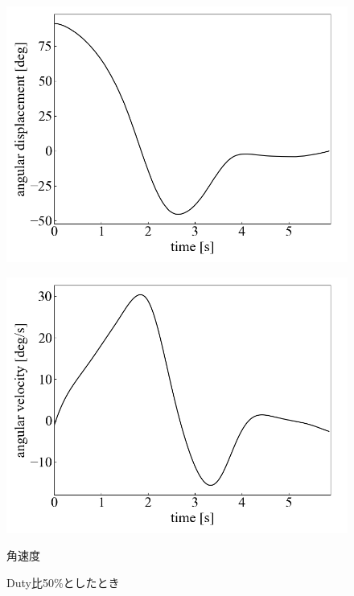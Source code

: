 \begin{figure}[h]
	\centering
	\begin{minipage}{0.43\columnwidth}
	  \centering
	  \includegraphics[width=\columnwidth]{./figure/duty50deg.png}
	  \label{fig:duty50deg}
	\end{minipage}
	\hspace{5mm}
	\begin{minipage}{0.43\columnwidth}
	  \centering
	  \includegraphics[width=\columnwidth]{./figure/duty50degpers.png}
	  \caption{角速度}
	  \label{fig:duty50degpers}
	\end{minipage}
	\caption{Duty比50\%としたとき}
	\label{fig:Duty50}
  \end{figure}

